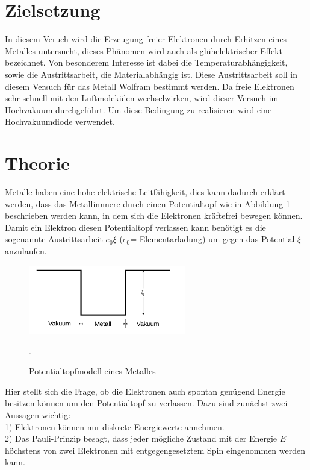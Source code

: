 \section{Zielsetzung}
In diesem Veruch wird die Erzeugung freier Elektronen durch Erhitzen eines
Metalles untersucht, dieses Phänomen wird auch als glühelektrischer Effekt
bezeichnet. Von besonderem Interesse ist dabei die Temperaturabhängigkeit, sowie
die Austrittsarbeit, die Materialabhängig ist. Diese Austrittsarbeit soll
in diesem Versuch für das Metall Wolfram bestimmt werden.
Da freie Elektronen sehr schnell mit den Luftmolekülen wechselwirken, wird dieser
Versuch im Hochvakuum durchgeführt. Um diese Bedingung zu realisieren wird eine
Hochvakuumdiode verwendet.

\section{Theorie}
Metalle haben eine hohe elektrische Leitfähigkeit, dies kann dadurch erklärt werden, dass
das Metallinnnere durch einen Potentialtopf wie in Abbildung \ref{fig:topf} beschrieben werden kann,
in dem sich die Elektronen kräftefrei bewegen können. Damit ein Elektron
diesen Potentialtopf verlassen kann benötigt es die sogenannte Austrittsarbeit
$e_{0}\xi$ ($e_{0}$= Elementarladung) um gegen das Potential $\xi$ anzulaufen.
\begin{figure}
  \centering
  \includegraphics[height=3cm]{potentialtopf.png}
  \caption{Potentialtopfmodell eines Metalles}
  \label{fig:topf}
  \cite{skript}.
\end{figure}

Hier stellt sich die Frage, ob die Elektronen auch spontan genügend Energie besitzen
können um den Potentialtopf zu verlassen. Dazu sind zunächst zwei Aussagen wichtig:\\
1) Elektronen können nur diskrete Energiewerte annehmen.\\
2) Das Pauli-Prinzip besagt, dass jeder mögliche Zustand mit der Energie $E$ höchstens
\:\:\: von zwei Elektronen mit entgegengesetztem Spin eingenommen werden kann.\\

